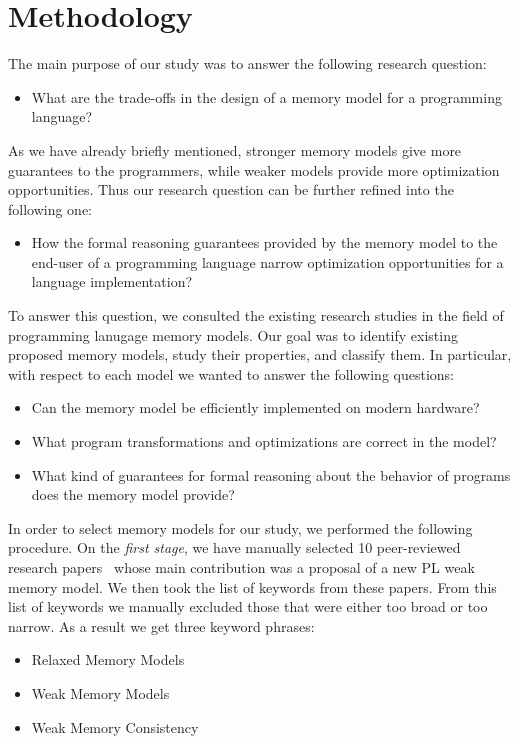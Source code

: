 \section{Methodology}
\label{sec:methodology}

The main purpose of our study was to answer the following research question:

\begin{itemize}
  \item What are the trade-offs in the design of a memory model for a programming language?
\end{itemize}

As we have already briefly mentioned, stronger memory models 
give more guarantees to the programmers, while weaker models 
provide more optimization opportunities. 
Thus our research question can be further refined into the following one:

\begin{itemize}
  \item How the formal reasoning guarantees provided by the memory model 
    to the end-user of a programming language narrow  
    optimization opportunities for a language implementation?
\end{itemize}

To answer this question, we consulted the existing research studies 
in the field of programming lanugage memory models.
Our goal was to identify existing proposed memory models, 
study their properties, and classify them.
In particular, with respect to each model we wanted to answer the following questions:

\begin{itemize}
  
  \item Can the memory model be efficiently implemented on modern hardware? 

  \item What program transformations and optimizations are correct in the model? 

  \item What kind of guarantees for formal reasoning about the behavior 
    of programs does the memory model provide?
  
\end{itemize}

In order to select memory models for our study, we performed the following procedure.
On the \emph{first stage}, we have manually selected 10  
peer-reviewed research papers~\cite{
Manson-al:POPL05,
Batty-al:POPL11,
Lahav-al:PLDI17,
Dolan-al:PLDI18,
Watt-al:PLDI2020,
Jeffrey-Riely:LICS16,
PichonPharabod-Sewell:POPL16,
Kang-al:POPL17,
Chakraborty-Vafeiadis:POPL19,
Paviotti-al:ESOP20
} 
whose main contribution was a proposal of a new PL weak memory model.
We then took the list of keywords from these papers. 
From this list of keywords we manually excluded those 
that were either too broad or too narrow.
As a result we get three keyword phrases:
\begin{itemize}
  \item Relaxed Memory Models
  \item Weak Memory Models
  \item Weak Memory Consistency
\end{itemize}
 
